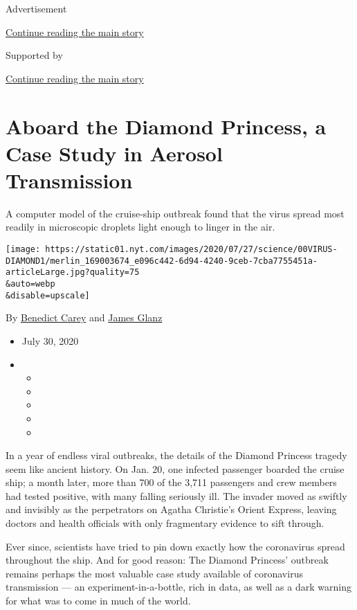 Advertisement

\protect\hyperlink{after-top}{Continue reading the main story}

Supported by

\protect\hyperlink{after-sponsor}{Continue reading the main story}

\hypertarget{aboard-the-diamond-princess-a-case-study-in-aerosol-transmission}{%
\section{Aboard the Diamond Princess, a Case Study in Aerosol
Transmission}\label{aboard-the-diamond-princess-a-case-study-in-aerosol-transmission}}

A computer model of the cruise-ship outbreak found that the virus spread
most readily in microscopic droplets light enough to linger in the air.

\texttt{[image: https://static01.nyt.com/images/2020/07/27/science/00VIRUS-DIAMOND1/merlin\_169003674\_e096c442-6d94-4240-9ceb-7cba7755451a-articleLarge.jpg?quality=75\\\&auto=webp\\\&disable=upscale]}

By \href{https://www.nytimes.com/by/benedict-carey}{Benedict Carey} and
\href{https://www.nytimes.com/by/james-glanz}{James Glanz}

\begin{itemize}
\item
  July 30, 2020
\item
  \begin{itemize}
  \item
  \item
  \item
  \item
  \item
  \end{itemize}
\end{itemize}

In a year of endless viral outbreaks, the details of the Diamond
Princess tragedy seem like ancient history. On Jan. 20, one infected
passenger boarded the cruise ship; a month later, more than 700 of the
3,711 passengers and crew members had tested positive, with many falling
seriously ill. The invader moved as swiftly and invisibly as the
perpetrators on Agatha Christie's Orient Express, leaving doctors and
health officials with only fragmentary evidence to sift through.

Ever since, scientists have tried to pin down exactly how the
coronavirus spread throughout the ship. And for good reason: The Diamond
Princess' outbreak remains perhaps the most valuable case study
available of coronavirus transmission --- an experiment-in-a-bottle,
rich in data, as well as a dark warning for what was to come in much of
the world.

